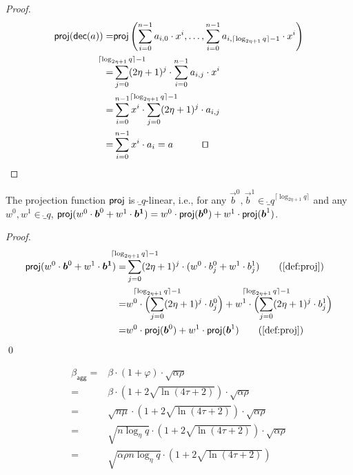 \begin{proof}
    \begin{align*}
      \proj(\decomp(a)) =& \proj\left(\sum_{i=0}^{n-1} a_{i,0}\cdot x^i, \dots, \sum_{i=0}^{n-1} a_{i,\lceil\log_{2\eta+1} q\rceil -1}\cdot x^i\right)\\
      =& \smashoperator{\sum_{j=0}^{\lceil\log_{2\eta+1} q\rceil -1}} (2\eta+1)^j \cdot \sum_{i=0}^{n-1} a_{i,j}\cdot x^i\\
      =& \sum_{i=0}^{n-1} x^i\cdot \smashoperator{\sum_{j=0}^{\lceil\log_{2\eta+1} q\rceil -1}} (2\eta+1)^j \cdot a_{i,j}\\
      =& \sum_{i=0}^{n-1} x^i\cdot a_i=a\tag*{\qed}
    \end{align*}
\end{proof}
  

\begin{lemma}\label{lem:projislin}
  The projection function $\mathsf{proj}$ is $\ring_q$-linear, i.e., for any $\vec{b}^0,\vec{b}^1 \in \ring_q^{\lceil\log_{2\eta+1} q\rceil}$ and any $w^0,w^1 \in \ring_q$, $\mathsf{proj}(w^0\cdot\boldsymbol{b}^0+w^1\cdot\boldsymbol{b^1}) = w^0\cdot\mathsf{proj}(\boldsymbol{b^0}) + w^1\cdot\mathsf{proj}(\boldsymbol{b}^1)$.
\end{lemma}
\begin{proof}
  \begin{align*}
    \vspace{-1cm}
    \proj(w^0\cdot\vec{b}^0+w^1\cdot\vec{b^1})
    =&\smashoperator{\sum_{j=0}^{\lceil\log_{2\eta+1} q\rceil -1}} (2\eta+1)^j\cdot (w^0\cdot b^0_j+w^1\cdot b^1_j)\tag{\autoref{def:proj}}\\
    =&w^0\cdot \Bigl(\smashoperator{\sum_{j=0}^{\lceil\log_{2\eta+1} q\rceil -1}} (2\eta+1)^j\cdot b^0_j\Bigr) + w^1\cdot\Bigl( \smashoperator{\sum_{j=0}^{\lceil\log_{2\eta+1} q\rceil -1}} (2\eta+1)^j\cdot b^1_j\Bigr)\\
    =&w^0\cdot \proj(\vec{b}^0) + w^1\cdot\proj(\vec{b}^1)\tag{\autoref{def:proj}}
  \end{align*}
  \qed
\end{proof}

\begin{align}
  \beta_{\mathsf{agg}} =& \beta\cdot(1+\varphi)\cdot \sqrt{\alpha\rho}\\
  =& \beta\cdot(1+2\sqrt{\ln(4\tau+2)})\cdot\sqrt{\alpha\rho}\\
  =& \sqrt{n\mu}\cdot(1+2\sqrt{\ln(4\tau+2)})\cdot\sqrt{\alpha\rho}\\
  =& \sqrt{n\log_\eta q}\cdot(1+2\sqrt{\ln(4\tau+2)})\cdot\sqrt{\alpha\rho}\\
  =& \sqrt{\alpha\rho n\log_\eta q}\cdot(1+2\sqrt{\ln(4\tau+2)})\\
\end{align}

